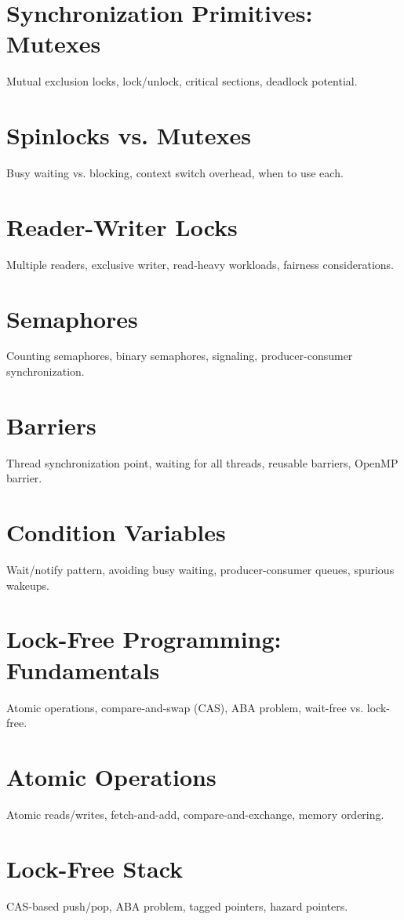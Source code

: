 \chapter{Synchronization Primitives: Mutexes}
Mutual exclusion locks, lock/unlock, critical sections, deadlock potential.

\chapter{Spinlocks vs. Mutexes}
Busy waiting vs. blocking, context switch overhead, when to use each.

\chapter{Reader-Writer Locks}
Multiple readers, exclusive writer, read-heavy workloads, fairness considerations.

\chapter{Semaphores}
Counting semaphores, binary semaphores, signaling, producer-consumer synchronization.

\chapter{Barriers}
Thread synchronization point, waiting for all threads, reusable barriers, OpenMP barrier.

\chapter{Condition Variables}
Wait/notify pattern, avoiding busy waiting, producer-consumer queues, spurious wakeups.

\chapter{Lock-Free Programming: Fundamentals}
Atomic operations, compare-and-swap (CAS), ABA problem, wait-free vs. lock-free.

\chapter{Atomic Operations}
Atomic reads/writes, fetch-and-add, compare-and-exchange, memory ordering.

\chapter{Lock-Free Stack}
CAS-based push/pop, ABA problem, tagged pointers, hazard pointers.

